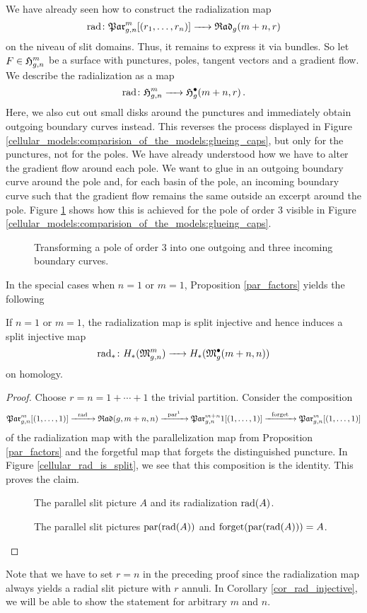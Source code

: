 We have already seen how to construct the radialization map
\[
    \radmap \colon \Parr \to \Radt_{g}(m+n,r)
\]
on the niveau of slit domains.
Thus, it remains to express it via bundles.
So let $F \in \Harm$ be a surface with punctures, poles, tangent vectors and a gradient flow.
We describe the radialization as a map
\[
   \radmap \colon \Harm \to \mathfrak H^\bullet_{g}(m + n, r)\,.
\]
Here, we also cut out small disks around the punctures and immediately obtain outgoing boundary curves instead.
This reverses the process displayed in Figure \ref{cellular_models:comparision_of_the_models:glueing_caps},
but only for the punctures, not for the poles.
We have already understood how we have to alter the gradient flow around each pole. 
We want to glue in an outgoing boundary curve around the pole and, for each basin of the pole, an incoming boundary curve
such that the gradient flow remains the same outside an excerpt around the pole.
Figure \ref{cellular_radialization_on_bundles_3} shows how this is achieved for the pole of order $3$ visible in Figure \ref{cellular_models:comparision_of_the_models:glueing_caps}.
\begin{figure}[ht]
\centering
\def\svgwidth{0.7\columnwidth}

\caption{\label{cellular_radialization_on_bundles_3} Transforming a pole of order $3$ into one outgoing and three incoming boundary curves.}
\end{figure}

In the special cases when $n = 1$ or $m = 1$, Proposition \ref{par_factors} yields the following

\begin{prop}
   If $n = 1$ or $m = 1$, the radialization map is split injective and hence induces a split injective map 
   \[
      \radmap_* \colon H_*(\Modspc[n]) \to H_*(\ModspcRadm[m+n])
   \]
on homology.
\begin{proof}
   Choose $r = n = 1 + \dotsb + 1$ the trivial partition.
   Consider the composition 
   \[
      \Part_{g, n}^m[(1, \dotsc, 1)] \xr{\radmap} \Radt(g, m+n, n) \xr{\parmap^{1}} \Part_{g, n}^{m+n}{1}[(1, \dotsc, 1)] \xr{\text{forget}} \Part_{g, n}^m[(1, \dotsc, 1)] 
   \]
   of the radialization map with the parallelization map from Proposition \ref{par_factors} and the forgetful map that forgets the distinguished puncture.
   In Figure \ref{cellular_rad_is_split}, we see that this composition is the identity.
   This proves the claim.
   
   \begin{figure}[ht]
   \centering
   \caption{\label{cellular_rad_is_split}The parallel slit picture $A$ and its radialization $\radmap(A)$.}
   \vspace{1cm}
   \caption{\label{cellular_rad_is_split_2}The parallel slit pictures $\parmap(\radmap(A))$ and $\text{forget}(\parmap(\radmap(A))) = A$.}
   \end{figure}

\end{proof}
\end{prop}

Note that we have to set $r = n$ in the preceding proof since the radialization map always yields a radial slit picture with $r$ annuli.
In Corollary \ref{cor_rad_injective}, we will be able to show the statement for arbitrary $m$ and $n$.